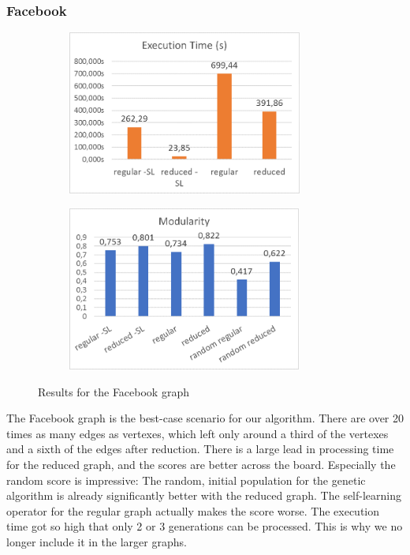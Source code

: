 \subsubsection{Facebook}
\begin{figure}[H]
\begin{center}
    \begin{subfigure}{0.47\textwidth}
    \begin{center}
    \includegraphics[height=5.4cm]{images/facebooktime.png}
    \end{center}
    \end{subfigure}
    \begin{subfigure}{0.47\textwidth}
    \begin{center}
    \includegraphics[height=5.4cm]{images/facebookfitness.png}
    \end{center}
    \end{subfigure}
\caption{Results for the Facebook graph}\label{fig:facebook}
\end{center}
\end{figure}
The Facebook graph is the best-case scenario for our algorithm. There are over 20 times as many edges as vertexes, which left only around a third of the vertexes and a sixth of the edges after reduction. There is a large lead in processing time for the reduced graph, and the scores are better across the board. Especially the random score is impressive: The random, initial population for the genetic algorithm is already significantly better with the reduced graph. The self-learning operator for the regular graph actually makes the score worse. The execution time got so high that only 2 or 3 generations can be processed. This is why we no longer include it in the larger graphs.

